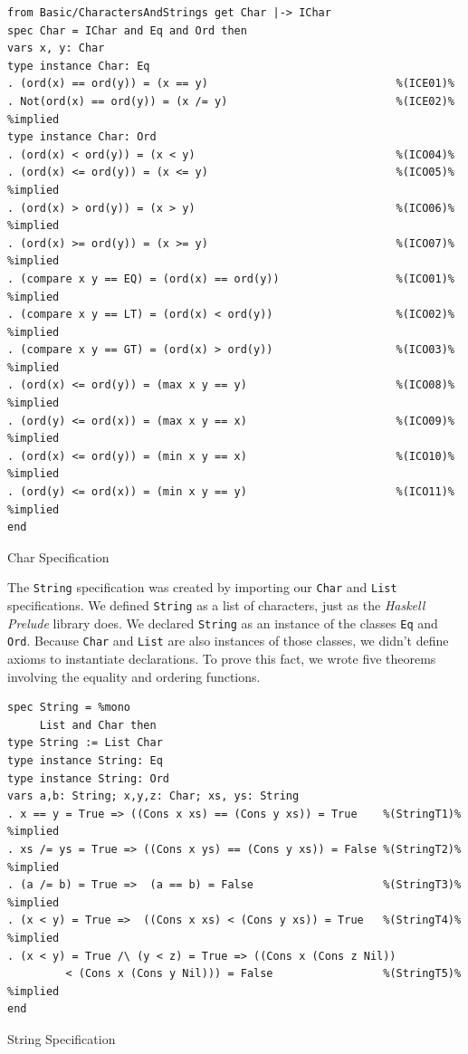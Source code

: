 \documentclass[12pt,twoside]{article}
\numberwithin{spec}{subsection}
\numberwithin{proof}{subsection}
\numberwithin{figure}{subsection}
\numberwithin{code}{subsection}
\begin{document}
\begin{spec}\capstart
\begin{verbatim}
from Basic/CharactersAndStrings get Char |-> IChar
spec Char = IChar and Eq and Ord then
vars x, y: Char
type instance Char: Eq
. (ord(x) == ord(y)) = (x == y)                             %(ICE01)%
. Not(ord(x) == ord(y)) = (x /= y)                          %(ICE02)% %implied
type instance Char: Ord
. (ord(x) < ord(y)) = (x < y)                               %(ICO04)%
. (ord(x) <= ord(y)) = (x <= y)                             %(ICO05)% %implied
. (ord(x) > ord(y)) = (x > y)                               %(ICO06)% %implied
. (ord(x) >= ord(y)) = (x >= y)                             %(ICO07)% %implied
. (compare x y == EQ) = (ord(x) == ord(y))                  %(ICO01)% %implied
. (compare x y == LT) = (ord(x) < ord(y))                   %(ICO02)% %implied
. (compare x y == GT) = (ord(x) > ord(y))                   %(ICO03)% %implied
. (ord(x) <= ord(y)) = (max x y == y)                       %(ICO08)% %implied
. (ord(y) <= ord(x)) = (max x y == x)                       %(ICO09)% %implied
. (ord(x) <= ord(y)) = (min x y == x)                       %(ICO10)% %implied
. (ord(y) <= ord(x)) = (min x y == y)                       %(ICO11)% %implied
end
\end{verbatim}
\caption{Char Specification}
\label{spec:Char}
\end{spec}

The \verb.String. specification was created by importing our \verb.Char. and \verb.List. specifications. We defined \verb.String. as a list of characters, just as the \textit{Haskell Prelude} library does. We declared \verb.String. as an instance of the classes \verb.Eq. and \verb.Ord.. Because \verb.Char. and \verb.List. are also instances of those classes, we didn't define axioms to instantiate declarations. To prove this fact, we wrote five theorems involving the equality and ordering functions.

\begin{spec}[H]\capstart
\begin{verbatim}
spec String = %mono
     List and Char then
type String := List Char
type instance String: Eq
type instance String: Ord
vars a,b: String; x,y,z: Char; xs, ys: String
. x == y = True => ((Cons x xs) == (Cons y xs)) = True    %(StringT1)% %implied
. xs /= ys = True => ((Cons x ys) == (Cons y xs)) = False %(StringT2)% %implied
. (a /= b) = True =>  (a == b) = False                    %(StringT3)% %implied
. (x < y) = True =>  ((Cons x xs) < (Cons y xs)) = True   %(StringT4)% %implied
. (x < y) = True /\ (y < z) = True => ((Cons x (Cons z Nil)) 
         < (Cons x (Cons y Nil))) = False                 %(StringT5)% %implied
end
\end{verbatim}
\caption{String Specification}
\label{spec:String}
\end{spec}
\end{document}
